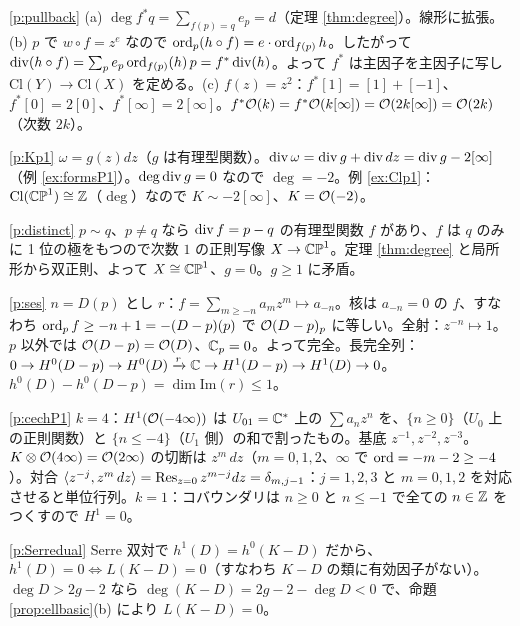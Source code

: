 \begin{sol}{\ref{p:pullback}}
(a) $\deg f^*q=\sum_{f(p)=q}e_p=d$（定理 \ref{thm:degree}）。線形に拡張。(b) $p$ で $w\circ f=z^e$ なので $\operatorname{ord}_p(h\circ f)=e\cdot\operatorname{ord}_{f(p)}h$。したがって $\operatorname{div}(h\circ f)=\sum_pe_p\operatorname{ord}_{f(p)}(h)\,p=f^*\operatorname{div}(h)$。よって $f^*$ は主因子を主因子に写し $\mathrm{Cl}(Y)\to\mathrm{Cl}(X)$ を定める。(c) $f(z)=z^2$：$f^*[1]=[1]+[-1]$、$f^*[0]=2[0]$、$f^*[\infty]=2[\infty]$。$f^*\mathcal O(k)=f^*\mathcal O(k[\infty])=\mathcal O(2k[\infty])=\mathcal O(2k)$（次数 $2k$）。
\end{sol}
\begin{sol}{\ref{p:Kp1}}
$\omega=g(z)dz$（$g$ は有理型関数）。$\operatorname{div}\omega=\operatorname{div} g+\operatorname{div} dz=\operatorname{div} g-2[\infty]$（例 \ref{ex:formsP1}）。$\deg\operatorname{div} g=0$ なので $\deg=-2$。例 \ref{ex:Clp1}：$\mathrm{Cl}(\mathbb{CP}^1)\cong\mathbb Z$（$\deg$）なので $K\sim-2[\infty]$、$K=\mathcal O(-2)$。
\end{sol}
\begin{sol}{\ref{p:distinct}}
$p\sim q$、$p\ne q$ なら $\operatorname{div} f=p-q$ の有理型関数 $f$ があり、$f$ は $q$ のみに 1 位の極をもつので次数 $1$ の正則写像 $X\to\mathbb{CP}^1$。定理 \ref{thm:degree} と局所形から双正則、よって $X\cong\mathbb{CP}^1$、$g=0$。$g\ge1$ に矛盾。
\end{sol}
\begin{sol}{\ref{p:ses}}
$n=D(p)$ とし $r$：$f=\sum_{m\ge-n}a_mz^m\mapsto a_{-n}$。核は $a_{-n}=0$ の $f$、すなわち $\operatorname{ord}_p f\ge-n+1=-(D-p)(p)$ で $\mathcal O(D-p)_p$ に等しい。全射：$z^{-n}\mapsto1$。$p$ 以外では $\mathcal O(D-p)=\mathcal O(D)$、$\mathbb C_p=0$。よって完全。長完全列：$0\to H^0(D-p)\to H^0(D)\xrightarrow{r}\mathbb C\to H^1(D-p)\to H^1(D)\to0$。$h^0(D)-h^0(D-p)=\dim\mathrm{Im}(r)\le1$。
\end{sol}
\begin{sol}{\ref{p:cechP1}}
$k=4$：$H^1(\mathcal O(-4\infty))$ は $U_{01}=\mathbb C^*$ 上の $\sum a_nz^n$ を、$\{n\ge0\}$（$U_0$ 上の正則関数）と $\{n\le-4\}$（$U_1$ 側）の和で割ったもの。基底 $z^{-1},z^{-2},z^{-3}$。$K\otimes\mathcal O(4\infty)=\mathcal O(2\infty)$ の切断は $z^m\,dz$（$m=0,1,2$、$\infty$ で $\operatorname{ord}=-m-2\ge-4$）。対合 $\langle z^{-j},z^m\,dz\rangle=\operatorname{Res}_{z=0}z^{m-j}dz=\delta_{m,j-1}$：$j=1,2,3$ と $m=0,1,2$ を対応させると単位行列。$k=1$：コバウンダリは $n\ge0$ と $n\le-1$ で全ての $n\in\mathbb Z$ をつくすので $H^1=0$。
\end{sol}
\begin{sol}{\ref{p:Serredual}}
Serre 双対で $h^1(D)=h^0(K-D)$ だから、$h^1(D)=0\iff L(K-D)=0$（すなわち $K-D$ の類に有効因子がない）。$\deg D>2g-2$ なら $\deg(K-D)=2g-2-\deg D<0$ で、命題 \ref{prop:ellbasic}(b) により $L(K-D)=0$。
\end{sol}
